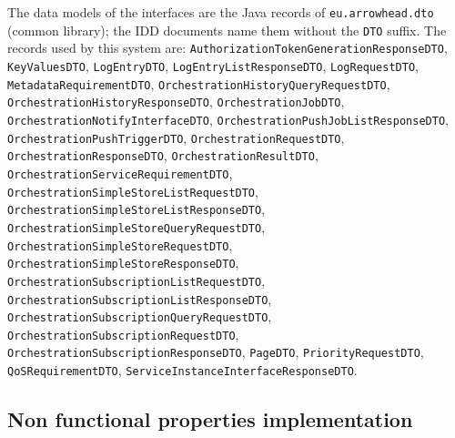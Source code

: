 \documentclass[a4paper]{arrowhead}
\begin{document}
The data models of the interfaces are the Java records of \texttt{eu.arrowhead.dto} (common library); the IDD documents name them without the \texttt{DTO} suffix. The records used by this system are: \texttt{Authorization\allowbreak{}Token\allowbreak{}Generation\allowbreak{}Response\allowbreak{}DTO}, \texttt{KeyValuesDTO}, \texttt{LogEntryDTO}, \texttt{Log\allowbreak{}Entry\allowbreak{}List\allowbreak{}Response\allowbreak{}DTO}, \texttt{LogRequestDTO}, \texttt{Metadata\allowbreak{}Requirement\allowbreak{}DTO}, \texttt{Orchestration\allowbreak{}History\allowbreak{}Query\allowbreak{}Request\allowbreak{}DTO}, \texttt{Orchestration\allowbreak{}History\allowbreak{}Response\allowbreak{}DTO}, \texttt{Orchestration\allowbreak{}Job\allowbreak{}DTO}, \texttt{Orchestration\allowbreak{}Notify\allowbreak{}Interface\allowbreak{}DTO}, \texttt{Orchestration\allowbreak{}Push\allowbreak{}Job\allowbreak{}List\allowbreak{}Response\allowbreak{}DTO}, \texttt{Orchestration\allowbreak{}Push\allowbreak{}Trigger\allowbreak{}DTO}, \texttt{Orchestration\allowbreak{}Request\allowbreak{}DTO}, \texttt{Orchestration\allowbreak{}Response\allowbreak{}DTO}, \texttt{Orchestration\allowbreak{}Result\allowbreak{}DTO}, \texttt{Orchestration\allowbreak{}Service\allowbreak{}Requirement\allowbreak{}DTO}, \texttt{Orchestration\allowbreak{}Simple\allowbreak{}Store\allowbreak{}List\allowbreak{}Request\allowbreak{}DTO}, \texttt{Orchestration\allowbreak{}Simple\allowbreak{}Store\allowbreak{}List\allowbreak{}Response\allowbreak{}DTO}, \texttt{Orchestration\allowbreak{}Simple\allowbreak{}Store\allowbreak{}Query\allowbreak{}Request\allowbreak{}DTO}, \texttt{Orchestration\allowbreak{}Simple\allowbreak{}Store\allowbreak{}Request\allowbreak{}DTO}, \texttt{Orchestration\allowbreak{}Simple\allowbreak{}Store\allowbreak{}Response\allowbreak{}DTO}, \texttt{Orchestration\allowbreak{}Subscription\allowbreak{}List\allowbreak{}Request\allowbreak{}DTO}, \texttt{Orchestration\allowbreak{}Subscription\allowbreak{}List\allowbreak{}Response\allowbreak{}DTO}, \texttt{Orchestration\allowbreak{}Subscription\allowbreak{}Query\allowbreak{}Request\allowbreak{}DTO}, \texttt{Orchestration\allowbreak{}Subscription\allowbreak{}Request\allowbreak{}DTO}, \texttt{Orchestration\allowbreak{}Subscription\allowbreak{}Response\allowbreak{}DTO}, \texttt{PageDTO}, \texttt{PriorityRequestDTO}, \texttt{QoSRequirementDTO}, \texttt{Service\allowbreak{}Instance\allowbreak{}Interface\allowbreak{}Response\allowbreak{}DTO}.

\subsection{Non functional properties implementation}
\end{document}
